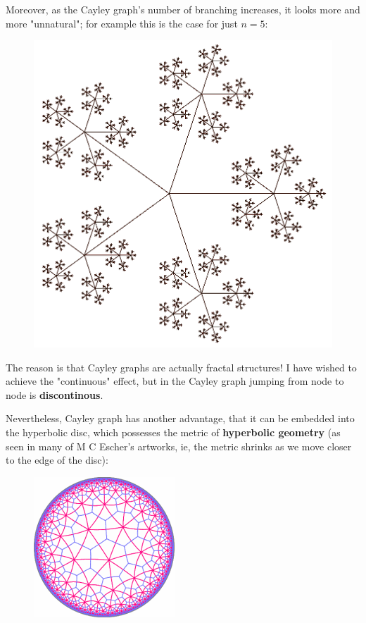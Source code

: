 \documentclass[12pt]{article}
\begin{document}
Moreover, as the Cayley graph's number of branching increases, it looks more and more "unnatural";  for example this is the case for just $n=5$:
\begin{figure}[H]
\centering
\includegraphics[scale=0.25]{cayley-graph-5.png}
\end{figure}
The reason is that Cayley graphs are actually fractal structures!  I have wished to achieve the "continuous" effect, but in the Cayley graph jumping from node to node is \textbf{discontinous}.

Nevertheless, Cayley graph has another advantage, that it can be embedded into the hyperbolic disc, which possesses the metric of \textbf{hyperbolic geometry}  (as seen in many of M C Escher's artworks, ie, the metric shrinks as we move closer to the edge of the disc):
\begin{figure}[H]
\centering
\includegraphics[scale=0.75]{hyperbolic-disc-beautiful.png}
\end{figure}
\end{document}
